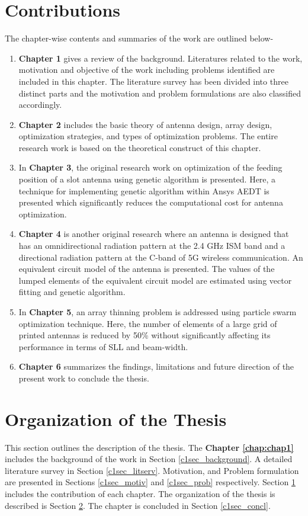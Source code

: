 \section{Contributions} \label{c1sec_contrib}
The chapter-wise contents and summaries of the work are outlined below-
\begin{enumerate}
\item \textbf{Chapter 1} gives a review of the background. Literatures related to the work, motivation and objective of the work including problems identified are included in this chapter. The literature survey has been divided into three distinct parts and the motivation and problem formulations are also classified accordingly.
\item \textbf{Chapter 2} includes the basic theory of antenna design, array design, optimization strategies, and types of optimization problems. The entire research work is based on the theoretical construct of this chapter.
\item In \textbf{Chapter 3}, the original research work on optimization of the feeding position of a slot antenna using genetic algorithm is presented. Here, a technique for implementing genetic algorithm within Ansys AEDT is presented which significantly reduces the computational cost for antenna optimization.
\item \textbf{Chapter 4} is another original research where an antenna is designed that has an omnidirectional radiation pattern at the 2.4 GHz ISM band and a directional radiation pattern at the C-band of 5G wireless communication. An equivalent circuit model of the antenna is presented. The values of the lumped elements of the equivalent circuit model are estimated using vector fitting and genetic algorithm.
\item In \textbf{Chapter 5}, an array thinning problem is addressed using particle swarm optimization technique. Here, the number of elements of a large grid of printed antennas is reduced by 50\% without significantly affecting its performance in terms of SLL and beam-width.
\item \textbf{Chapter 6} summarizes the findings, limitations and future direction of the present work to conclude the thesis.
\end{enumerate}
\section{Organization of the Thesis} \label{c1sec_organiz}
This section outlines the description of the thesis. The \textbf{Chapter \ref{chap:chap1}} includes the background of the work in Section \ref{c1sec_background}. A detailed literature survey in Section \ref{c1sec_litserv}. Motivation, and Problem formulation are presented in Sections \ref{c1sec_motiv} and \ref{c1sec_prob} respectively. Section \ref{c1sec_contrib} includes the contribution of each chapter. The organization of the thesis is described is Section \ref{c1sec_organiz}. The chapter is concluded in Section \ref{c1sec_concl}.

